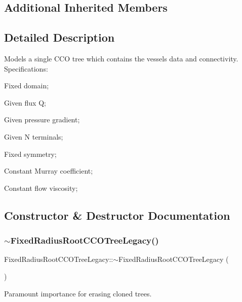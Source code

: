 \subsection*{Additional Inherited Members}


\subsection{Detailed Description}
Models a single C\+CO tree which contains the vessel\textquotesingle{}s data and connectivity. Specifications\+:
\begin{DoxyItemize}
\item Fixed domain;
\item Given flux Q;
\item Given pressure gradient;
\item Given N terminals;
\item Fixed symmetry;
\item Constant Murray coefficient;
\item Constant flow viscosity; 
\end{DoxyItemize}

\subsection{Constructor \& Destructor Documentation}
\mbox{\label{class_fixed_radius_root_c_c_o_tree_legacy_a4cf9e8bf1edd2cb4c7f22a3deb9b52ff}} 
\subsubsection{\texorpdfstring{$\sim$\+Fixed\+Radius\+Root\+C\+C\+O\+Tree\+Legacy()}{~FixedRadiusRootCCOTreeLegacy()}}
{\footnotesize\ttfamily Fixed\+Radius\+Root\+C\+C\+O\+Tree\+Legacy\+::$\sim$\+Fixed\+Radius\+Root\+C\+C\+O\+Tree\+Legacy (\begin{DoxyParamCaption}{ }\end{DoxyParamCaption})}

Paramount importance for erasing cloned trees. 

